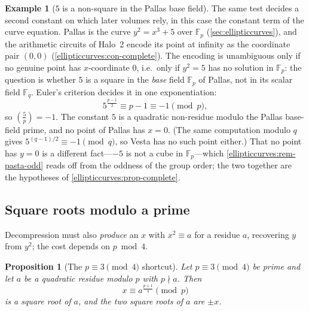 \documentclass[11pt,a4paper]{article}
\newtheorem{proposition}[theorem]{Proposition}
\theoremstyle{definition}
\newtheorem{example}[theorem]{Example}
\theoremstyle{remark}
\newcommand{\Fp}{\ensuremath{\mathbb{F}_{p}}}
\newcommand{\Fq}{\ensuremath{\mathbb{F}_{q}}}
\newcommand{\legendre}[2]{\left(\frac{#1}{#2}\right)}
\begin{document}
\begin{example}[\(5\) is a non-square in the Pallas base field]
\label{numbertheory:ex:pasta-five}
The same test decides a second constant on which later volumes rely,
in this case the constant term of the curve equation. Pallas is the curve
\(y^2 = x^3 + 5\) over \(\Fp\) (\cref{sec:ellipticcurves}), and the
arithmetic circuits of Halo~2 encode its point at infinity as the
coordinate pair \((0, 0)\) (\cref{ellipticcurves:con-complete}). The
encoding is unambiguous only if no genuine point has \(x\)-coordinate
\(0\), i.e.\ only if \(y^2 = 5\) has no solution in \(\Fp\): the question
is whether \(5\) is a square in the \emph{base} field \(\Fp\) of Pallas,
not in its scalar field \(\Fq\). Euler's criterion decides it in one
exponentiation:
\[
5^{\frac{p-1}{2}} \equiv p - 1 \equiv -1 \pmod{p},
\]
so \(\legendre{5}{p} = -1\). The constant \(5\) is a quadratic
non-residue modulo the Pallas base-field prime, and no point of Pallas
has \(x = 0\). (The same computation modulo \(q\) gives
\(5^{(q-1)/2} \equiv -1 \pmod{q}\), so Vesta has no such point either.)
That no point has \(y = 0\) is a different fact---\(-5\) is not a cube
in \(\Fp\)---which \cref{ellipticcurves:rem-pasta-odd} reads off from
the oddness of the group order; the two together are the hypotheses of
\cref{ellipticcurves:prop-complete}.
\end{example}

\subsection{Square roots modulo a prime}\label{numbertheory:sub:sqrt}

Decompression must also \emph{produce} an \(x\) with \(x^2 \equiv a\)
for a residue \(a\), recovering \(y\) from \(y^2\); the cost depends on
\(p \bmod 4\).

\begin{proposition}[The \(p \equiv 3 \pmod 4\) shortcut]
\label{numbertheory:prop:sqrt-3mod4}
Let \(p \equiv 3 \pmod 4\) be prime and let \(a\) be a quadratic residue
modulo \(p\) with \(p \nmid a\). Then
\[
x \equiv a^{\frac{p+1}{4}} \pmod{p}
\]
is a square root of \(a\), and the two square roots of \(a\) are
\(\pm x\).
\end{proposition}
\end{document}
